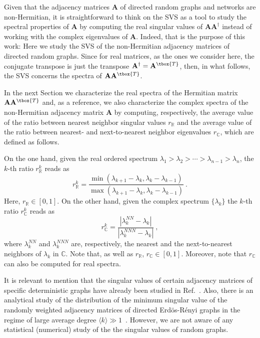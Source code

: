 Given that the adjacency matrices $\mathbf{A}$ of directed random graphs and networks are 
non-Hermitian, it is straightforward to think on the SVS as a tool to study the spectral properties of 
$\mathbf{A}$ by computing the real singular values of 
$\mathbf{A}\mathbf{A}^\dagger$ instead of working with the complex eigenvalues of $\mathbf{A}$.
Indeed, that is the purpose of this work: Here we study the SVS of the non-Hermitian adjacency matrices 
of directed random graphs.
Since for real matrices, as the ones we consider here, the conjugate transpose is just the transpose
$\mathbf{A}^\dagger=\mathbf{A}^{\tbox{T}}$,
then, in what follows, the SVS concerns the spectra of $\mathbf{A}\mathbf{A}^{\tbox{T}}$.

In the next Section we characterize the real spectra of the Hermitian matrix 
$\mathbf{A}\mathbf{A}^{\tbox{T}}$ and, as a reference, we also characterize the complex spectra 
of the non-Hermitian adjacency matrix $\mathbf{A}$ by computing, respectively, the average value 
of the ratio between nearest neighbor singular values $r_\mathbb{R}$ and the average value of 
the ratio between nearest- and next-to-nearest neighbor eigenvalues $r_\mathbb{C}$, which are 
defined as follows.

On the one hand, given the real ordered spectrum 
$\lambda_1>\lambda_2>\cdots>\lambda_{n-1}>\lambda_n$, the $k$-th ratio $r_\mathbb{R}^k$ 
reads as~\cite{OH07,ABGR13}
\begin{equation}
\label{rR}
r_\mathbb{R}^k = \frac{\min(\lambda_{k+1}- \lambda_k,\lambda_{k}- \lambda_{k-1})}{\max(\lambda_{k+1}- \lambda_k,\lambda_{k}- \lambda_{k-1})} \ .
\end{equation}
Here, $r_\mathbb{R}\in[0,1]$.
On the other hand, given the complex spectrum $\{ \lambda_k \}$ the $k$-th ratio $r_\mathbb{C}^k$ 
reads as~\cite{SRP20}
\begin{equation}
r_\mathbb{C}^k = \frac{\left| \lambda^{NN}_k - \lambda_k \right|}{\left| \lambda^{NNN}_k - \lambda_k \right|} \ ,
\label{rC}
\end{equation}
where $\lambda^{NN}_k$ and $\lambda^{NNN}_k$ are, respectively, the nearest and the next-to-nearest 
neighbors of $\lambda_k$ in $\mathbb{C}$. Note that, as well as $r_\mathbb{R}$, $r_\mathbb{C}\in[0,1]$. 
Moreover, note that $r_\mathbb{C}$ can also be computed for real spectra.

It is relevant to mention that the singular values of certain adjacency matrices of specific deterministic 
graphs have already been studied in Ref.~\cite{P06}.
Also, there is an analytical study of the distribution of the minimum singular value of the randomly weighted 
adjacency matrices of directed Erd\"os-R\'enyi graphs in the regime of large average degree 
$\langle k \rangle \gg 1$~\cite{CL17}.
However, we are not aware of any statistical (numerical) study of the the singular values of random graphs.


